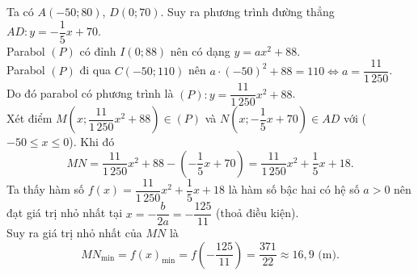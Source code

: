 \begin{ex}
{\begin{center}
		\end{center}
		Ta có $A(-50;80)$, $D(0;70)$. Suy ra phương trình đường thẳng $AD\colon y=-\dfrac{1}{5}x+70$.\\
		Parabol $(P)$ có đỉnh $I(0;88)$ nên có dạng $y=ax^2+88$.\\
		Parabol $(P)$ đi qua $C(-50;110)$ nên $a\cdot (-50)^2+88=110\Leftrightarrow a=\dfrac{11}{1\,250}$.\\
		Do đó parabol có phương trình là $(P)\colon y=\dfrac{11}{1\,250}x^2+88$.\\
		Xét điểm $M\left(x;\dfrac{11}{1\,250}x^2+88\right)\in (P)$ và $N\left(x;-\dfrac{1}{5}x
		+70\right)\in AD$ với ($-50\le x\le 0$). Khi đó
		\[MN=\dfrac{11}{1\,250}x^2+88-\left(-\dfrac{1}{5}x
		+70\right)=\dfrac{11}{1\,250}x^2+\dfrac{1}{5}x+18.\]
		Ta thấy hàm số $f(x)=\dfrac{11}{1\,250}x^2+\dfrac{1}{5}x+18$ là hàm số bậc hai có hệ số $a>0$ nên đạt giá trị nhỏ nhất tại $x=-\dfrac{b}{2a}=-\dfrac{125}{11}$ (thoả điều kiện).\\
		Suy ra giá trị nhỏ nhất của $MN$ là
		\[MN_{\min}=f(x)_{\min}=f\left(-\dfrac{125}{11}\right)=\dfrac{371}{22}\approx 16{,}9\text{ (m).}\]
	}
\end{ex}

